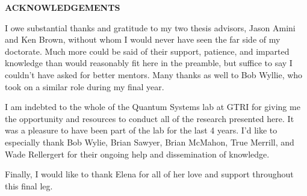 \clearpage
\begin{centering}
\textbf{ACKNOWLEDGEMENTS}\\
\vspace{\baselineskip}
\end{centering}

I owe substantial thanks and gratitude to my two thesis advisors, Jason Amini and Ken Brown, without whom I would never have seen the far side of my doctorate. Much more could be said of their support, patience, and imparted knowledge than would reasonably fit here in the preamble, but suffice to say I couldn't have asked for better mentors. Many thanks as well to Bob Wyllie, who took on a similar role during my final year. 

I am indebted to the whole of the Quantum Systems lab at GTRI for giving me the opportunity and resources to conduct all of the research presented here. It was a pleasure to have been part of the lab for the last 4 years. I'd like to especially thank Bob Wylie, Brian Sawyer, Brian McMahon, True Merrill, and Wade Rellergert for their ongoing help and dissemination of knowledge. 

Finally, I would like to thank Elena for all of her love and support throughout this final leg. 



\clearpage
